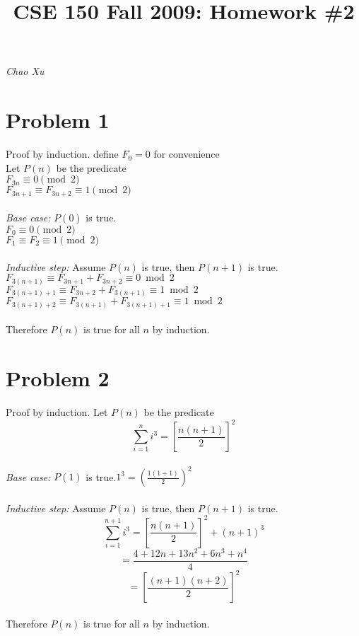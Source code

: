 \documentclass[letter]{article}
\title{CSE 150 Fall 2009: Homework \#2}
\date{}
\begin{document}
\maketitle
\vspace{-.5in}
\emph{Chao Xu}

\section*{Problem 1}

Proof by induction.
define $F_0 = 0$ for convenience\\
Let $P(n)$ be the predicate\\
$F_{3n} \equiv 0 \pmod 2$\\
$F_{3n+1} \equiv F_{3n+2} \equiv 1 \pmod 2$\\
 \\
\emph{Base case:} $P(0)$ is true.\\
$F_0 \equiv 0 \pmod 2$\\
$F_1 \equiv F_2 \equiv 1 \pmod 2$\\
 \\
\emph{Inductive step:} Assume $P(n)$ is true, then $P(n+1)$ is true.\\
$F_{3(n+1)} \equiv F_{3n+1} + F_{3n+2} \equiv 0 \bmod 2$\\
$F_{3(n+1)+1} \equiv F_{3n+2} + F_{3(n+1)} \equiv 1 \bmod 2$\\
$F_{3(n+1)+2} \equiv F_{3(n+1)} + F_{3(n+1)+1} \equiv 1 \bmod 2$\\
 \\
Therefore $P(n)$ is true for all $n$ by induction.

\section*{Problem 2}

Proof by induction.
Let $P(n)$ be the predicate\\
\[
\sum_{i=1}^{n}i^3=\left[\frac{n(n+1)}{2}\right]^2
\]
 \\
\emph{Base case:} $P(1)$ is true.$1^3 = (\frac{1(1+1)}{2})^2$\\
 \\
\emph{Inductive step:} Assume $P(n)$ is true, then $P(n+1)$ is true.\\
\[\sum_{i=1}^{n+1}i^3=\left[\frac{n(n+1)}{2}\right]^2+ (n+1)^3\]
\[=\frac{4+12n+13n^2+6n^3+n^4}{4}\]
\[=\left[\frac{(n+1)(n+2)}{2}\right]^2\]
 \\
Therefore $P(n)$ is true for all $n$ by induction.
\end{document}
